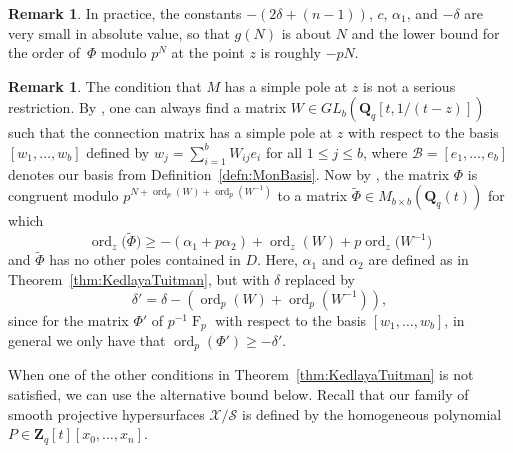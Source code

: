 \documentclass[a4paper,11pt]{article}
\numberwithin{equation}{section}
\newcommand{\ZZ}{\mathbf{Z}} %
\newcommand{\QQ}{\mathbf{Q}} %
\DeclareMathOperator{\ord}{ord}          %
\DeclareMathOperator{\Frob}{F}           %
\providecommand{\cB}{\mathcal{B}} %
\theoremstyle{definition}
\newtheorem{rem}[thm]{Remark}
\begin{document}
\begin{rem}
In practice, the constants $-(2 \delta + (n-1))$, $c$, $\alpha_1$, and $-\delta$ 
are very small in absolute value, so that $g(N)$ is about $N$ and 
the lower bound for the order of~$\Phi$ modulo $p^N$ at the point $z$ is 
roughly $-pN$.
\end{rem}

\begin{rem} \label{rem:basischange}
The condition that $M$ has a simple pole at $z$ is not a serious restriction. 
By \citep[Theorem 2.1]{Lauder2011}, one can always find a matrix $W \in GL_{b}(\QQ_q[t,1/(t-z)])$
such that the connection matrix has a simple pole at $z$ with respect to the basis 
$[w_1, \dotsc, w_b]$ defined by $w_j = \sum_{i=1}^b W_{ij} e_i$ for all 
$1 \leq j \leq b$, where $\cB=[e_1,\dotsc,e_b]$ denotes our basis from 
Definition~\ref{defn:MonBasis}. Now by \citep[Corollary 2.6]{KedlayaTuitman2012}, 
the matrix $\Phi$ is congruent modulo $p^{N+\ord_p(W)+\ord_p(W^{-1})}$ 
to a matrix $\tilde{\Phi} \in M_{b \times b}(\QQ_q(t))$ for which
\[
\ord_z\bigl(\tilde{\Phi}\bigr) \geq -(\alpha_1+p \alpha_2)+\ord_z(W)+p\ord_z\bigl(W^{-1}\bigr)
\]
and $\tilde{\Phi}$ has no other poles contained in $D$.
Here, $\alpha_1$ and $\alpha_2$ are defined as in 
Theorem~\ref{thm:KedlayaTuitman}, but with $\delta$ replaced by
\begin{equation*}
\delta' = \delta-\left(\ord_p(W)+\ord_p\left(W^{-1}\right)\right), 
\end{equation*}
since for the matrix $\Phi'$ of $p^{-1}\Frob_p$ with respect to the basis 
$[w_1,\dotsc,w_b]$, in general we only have that $\ord_p\left(\Phi'\right) \geq -\delta'$. 
\end{rem}

When one of the other conditions in Theorem~\ref{thm:KedlayaTuitman} is not satisfied, 
we can use the alternative bound below. Recall that our family of 
smooth projective hypersurfaces $\mathcal{X}/\mathcal{S}$ is defined by the homogeneous 
polynomial $P \in \ZZ_q[t][x_0,\dotsc,x_n]$.
\end{document}
